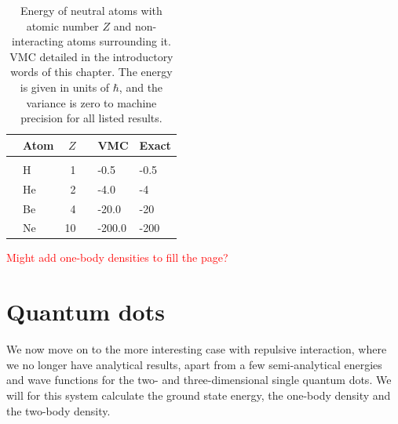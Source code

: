 \begin{table}
	\caption{Energy of neutral atoms with atomic number $Z$ and non-interacting atoms surrounding it. VMC detailed in the introductory words of this chapter. The energy is given in units of $\hbar$, and the variance is zero to machine precision for all listed results.}
	\label{tab:atomswointeraction}
	\begin{tabularx}{\textwidth}{R{3.5cm}lrrR{2.5cm}R{2.5cm}} \hline\hline
		& Atom & $Z$ & \makecell{\\ \phantom{=}} & VMC & Exact \\ \hline \\
		
		& H & 1 && -0.5 & -0.5 \\
		& He & 2 && -4.0 & -4 \\
		& Be & 4 && -20.0 & -20 \\
		& Ne & 10 && -200.0 & -200 \\ \hline\hline
	\end{tabularx}
\end{table}

\textcolor{red}{Might add one-body densities to fill the page?}

\cleardoublepage
\section{Quantum dots}
We now move on to the more interesting case with repulsive interaction, where we no longer have analytical results, apart from a few semi-analytical energies and wave functions  for the two- and three-dimensional single quantum dots. We will for this system calculate the ground state energy, the one-body density and the two-body density. 

